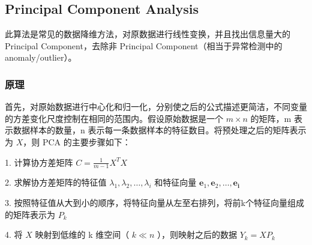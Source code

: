 \documentclass[UTF8]{ctexart}
\begin{document}

    \subsection{Principal Component Analysis}
    此算法是常见的数据降维方法，对原数据进行线性变换，并且找出信息量大的 Principal Component，去除非 Principal Component（相当于异常检测中的 anomaly/outlier）。
        \subsubsection{原理}
        首先，对原始数据进行中心化和归一化，分别使之后的公式描述更简洁，不同变量的方差变化尺度控制在相同的范围内。假设原始数据是一个 \( m \times n\) 的矩阵，m 表示数据样本的数量，n 表示每一条数据样本的特征数目。将预处理之后的矩阵表示为 \(X\)，则 PCA 的主要步骤如下：

        1. 计算协方差矩阵 \(C=\frac{1}{m-1} X^{T} X\)
        
        2. 求解协方差矩阵的特征值 \(\lambda_{1}, \lambda_{2}, \ldots, \lambda_{i}\) 和特征向量 \(\mathbf{e}_{1}, \mathbf{e}_{2}, \ldots, \mathbf{e}_{\mathbf{i}}\)

        3. 按照特征值从大到小的顺序，将特征向量从左至右排列，将前k个特征向量组成的矩阵表示为 \(P_{k}\)

        4. 将 \(X\) 映射到低维的 k 维空间（ \(k \ll n\) ），则映射之后的数据 \(Y_{k}=X P_{k}\)
\end{document}
